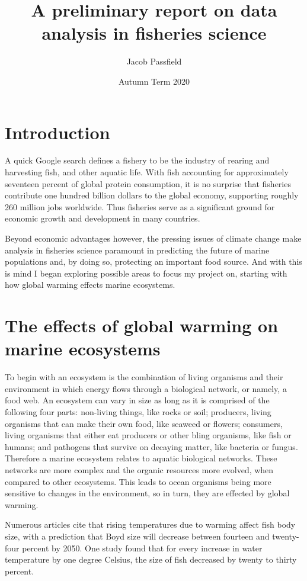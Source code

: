 \documentclass{article}
\title{\huge{\bf{A preliminary report on data analysis in fisheries science}}}
\author{Jacob Passfield}
\date{Autumn Term 2020}
\begin{document}
\maketitle

\section{Introduction}

A quick Google search defines a fishery to be the industry of rearing and harvesting fish, and other aquatic life. With fish accounting for approximately seventeen percent of global protein consumption, it is no surprise that fisheries contribute one hundred billion dollars to the global economy, supporting roughly 260 million jobs worldwide. Thus fisheries serve as a significant ground for economic growth and development in many countries. 

Beyond economic advantages however, the pressing issues of climate change make analysis in fisheries science paramount in predicting the future of marine populations and, by doing so, protecting an important food source. And with this is mind I began exploring possible areas to focus my project on, starting with how global warming effects marine ecosystems.

\section{The effects of global warming on marine ecosystems}

To begin with an ecosystem is the combination of living organisms and their environment in which energy flows through a biological network, or namely, a food web. An ecosystem can vary in size as long as it is comprised of the following four parts: non-living things, like rocks or soil; producers, living organisms that can make their own food, like seaweed or flowers; consumers, living organisms that either eat producers or other bling organisms, like fish or humans; and pathogens that survive on decaying matter, like bacteria or fungus. Therefore a marine ecosystem relates to aquatic biological networks. These networks are more complex and the organic resources more evolved, when compared to other ecosystems. This leads to ocean organisms being more sensitive to changes in the environment, so in turn, they are effected by global warming. 

Numerous articles cite that rising temperatures due to warming affect fish body size, with a prediction that Boyd size will decrease between fourteen and twenty-four percent by 2050. One study found that for every increase in water temperature by one degree Celsius, the size of fish decreased by twenty to thirty percent. 
\end{document}
